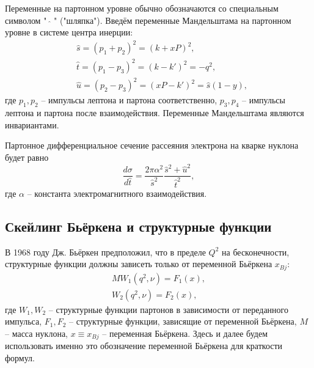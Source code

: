 \documentclass{extarticle}
\begin{document}
Переменные на партонном уровне обычно обозначаются со специальным символом "\ $\hat{}$ " ("шляпка"). Введём переменные Мандельштама на партонном уровне в системе центра инерции:
\begin{equation}
\begin{split}
	& \hat{s} = (p_1+p_2)^2 = (k + xP)^2, \\
	& \hat{t} = (p_1-p_3)^2 = (k-k')^2 = -q^2, \\
	& \hat{u} = (p_2-p_3)^2 =(xP-k')^2= \hat{s} (1-y),
\end{split}
\end{equation}
где $p_1, p_2$ -- импульсы лептона и партона соответственно, $p_3, p_4$ -- импульсы лептона и партона после взаимодействия. Переменные Мандельштама являются инвариантами. 

Партонное дифференциальное сечение рассеяния электрона на кварке нуклона будет равно
\begin{equation}
	\frac{d\sigma}{d\hat{t}} = \frac{2\pi \alpha^2}{\hat{s}^2} \frac{\hat{s}^2 + \hat{u}^2}{\hat{t}^2},
\end{equation}
где $\alpha$ -- константа электромагнитного взаимодействия. 

\subsection{Скейлинг Бьёркена и структурные функции}

В 1968 году Дж. Бьёркен предположил, что в пределе $Q^2$ на бесконечности, структурные функции должны зависеть только от переменной Бьёркена $x_{Bj}$:
\begin{equation}
	\begin{split}
	MW_1(q^2, \nu) = F_1 (x) ,\\
	W_2(q^2, \nu) = F_2(x),
	\end{split}
	\label{eq:struct}
\end{equation}
где  $W_1, W_2$ -- структурные функции партонов в зависимости от переданного импульса, $F_1, F_2$ -- структурные функции, зависящие от переменной Бьёркена, $M$ -- масса нуклона, $x \equiv x_{Bj}$ -- переменная Бьёркена. Здесь и далее будем использовать именно это обозначение переменной Бьёркена для краткости формул.
\end{document}
